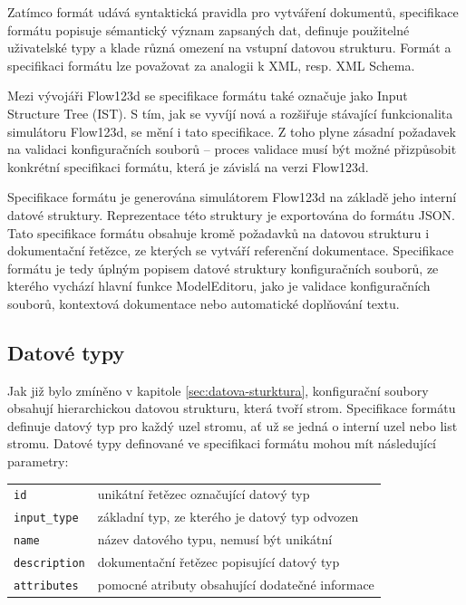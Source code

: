 \documentclass[FM,bw,DP]{tulthesis}
\begin{document}
Zatímco formát udává syntaktická pravidla pro vytváření dokumentů, specifikace formátu popisuje sémantický význam zapsaných dat, definuje použitelné uživatelské typy a klade různá omezení na vstupní datovou strukturu. Formát a specifikaci formátu lze považovat za analogii k XML, resp. XML Schema.

Mezi vývojáři Flow123d se specifikace formátu také označuje jako Input Structure Tree (IST). S tím, jak se vyvíjí nová a rozšiřuje stávající funkcionalita simulátoru Flow123d, se mění i tato specifikace. Z toho plyne zásadní požadavek na validaci konfiguračních souborů -- proces validace musí být možné přizpůsobit konkrétní specifikaci formátu, která je závislá na verzi Flow123d.

Specifikace formátu je generována simulátorem Flow123d na základě jeho interní datové struktury. Reprezentace této struktury je exportována do formátu JSON. Tato specifikace formátu obsahuje kromě požadavků na datovou strukturu i dokumentační řetězce, ze kterých se vytváří referenční dokumentace. Specifikace formátu je tedy úplným popisem datové struktury konfiguračních souborů, ze kterého vychází hlavní funkce ModelEditoru, jako je validace konfiguračních souborů, kontextová dokumentace nebo automatické doplňování textu.

\subsection{Datové typy}

Jak již bylo zmíněno v kapitole \ref{sec:datova-sturktura}, konfigurační soubory obsahují hierarchickou datovou strukturu, která tvoří strom. Specifikace formátu definuje datový typ pro každý uzel stromu, ať už se jedná o interní uzel nebo list stromu. Datové typy definované ve specifikaci formátu mohou mít následující parametry:

\vspace{0.5cm}
\begin{tabular}{m{3cm}@{}l}
\texttt{id}\dotfill & unikátní řetězec označující datový typ \\
\texttt{input\_type}\dotfill & základní typ, ze kterého je datový typ odvozen  \\
\texttt{name}\dotfill & název datového typu, nemusí být unikátní \\
\texttt{description}\dotfill & dokumentační řetězec popisující datový typ \\
\texttt{attributes}\dotfill & pomocné atributy obsahující dodatečné informace \\
\end{tabular}
\vspace{0.5cm}
\end{document}
